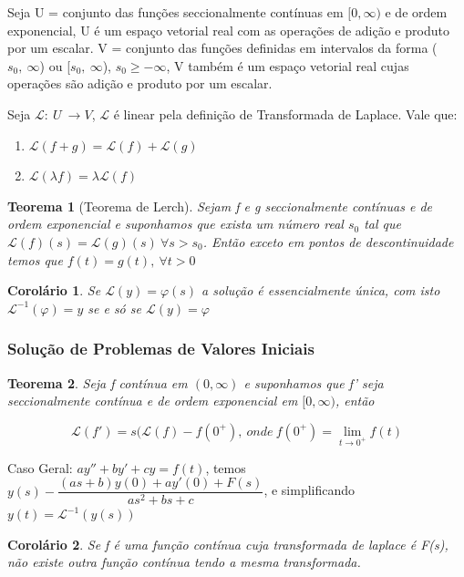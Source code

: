 \documentclass[12pt]{article}
\newtheorem{theorem}{Teorema}[section]
\newtheorem{corollary}{Corolário}[theorem]
\begin{document}
Seja U = {conjunto das funções seccionalmente contínuas em $[0, \infty )$ e de ordem exponencial}, U é um espaço vetorial real com as operações de adição e produto por um escalar. V = {conjunto das funções definidas em intervalos da forma ($s_0, \ \infty$) ou [$s_0, \ \infty$), $s_0 \geq - \infty$}, V também é um espaço vetorial real cujas operações são adição e produto por um escalar.

Seja $\mathscr{L}:\ U \ \xrightarrow{} V$, $\mathscr{L}$ é linear pela definição de Transformada de Laplace. Vale que:

\begin{enumerate}
    \item $\mathscr{L} (f + g) = \mathscr{L} (f) + \mathscr{L} (g)$
    
    \item $\mathscr{L} (\lambda f) = \lambda \mathscr{L}(f)$
\end{enumerate}

\begin{theorem}[Teorema de Lerch]
    Sejam f e g seccionalmente contínuas e de ordem exponencial e suponhamos que exista um número real $s_0$ tal que $\mathscr{L}(f)(s) = \mathscr{L}(g)(s) \ \forall s > s_0$. Então exceto em pontos de descontinuidade temos que $f(t) = g(t), \ \forall t > 0$
\end{theorem}

\begin{corollary}
    Se $\mathscr{L}(y) = \varphi(s)$ a solução é essencialmente única, com isto $\mathscr{L}^{-1} (\varphi) = y$ se e só se $\mathscr{L}(y) = \varphi$
\end{corollary}

\subsubsection*{Solução de Problemas de Valores Iniciais}
\begin{theorem}
    Seja f contínua em $(0, \infty)$ e suponhamos que f' seja seccionalmente contínua e de ordem exponencial em $[0, \infty)$, então
    
    $$\mathscr{L}(f') = s (\mathscr{L}(f) - f(0^+), \ onde \ f(0^+) = \lim_{t \xrightarrow{} 0^+} f(t)$$
\end{theorem}

Caso Geral: $a y'' + b y' + c y = f(t)$, temos $y(s) - \dfrac{(as + b)y(0) + a y'(0) + F(s)}{as^2 + b s + c}$, e simplificando $y(t) = \mathscr{L}^{-1} (y(s))$

\begin{corollary}
    Se f é uma função contínua cuja transformada de laplace é F(s), não existe outra função contínua tendo a mesma transformada. 
\end{corollary}
\end{document}
